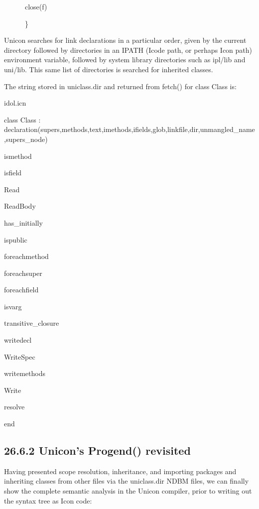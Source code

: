 {\ttfamily\mdseries
\ \ \ \ \ \ close(f)}

{\ttfamily\mdseries
\ \ \ \ \ \ \}}


Unicon searches for {\textquotedbl}link{\textquotedbl} declarations in
a particular order, given by the current directory followed by
directories in an IPATH (Icode path, or perhaps Icon path) environment
variable, followed by system library directories such as ipl/lib and
uni/lib. This same list of directories is searched for inherited
classes.


The string stored in uniclass.dir and returned from fetch() for class Class is: 

{\ttfamily\mdseries
idol.icn}

{\ttfamily\mdseries
class Class : declaration(supers,methods,text,imethods,ifields,glob,linkfile,dir,unmangled\_name,supers\_node)}

{\ttfamily\mdseries
ismethod}

{\ttfamily\mdseries
isfield}

{\ttfamily\mdseries
Read}

{\ttfamily\mdseries
ReadBody}

{\ttfamily\mdseries
has\_initially}

{\ttfamily\mdseries
ispublic}

{\ttfamily\mdseries
foreachmethod}

{\ttfamily\mdseries
foreachsuper}

{\ttfamily\mdseries
foreachfield}

{\ttfamily\mdseries
isvarg}

{\ttfamily\mdseries
transitive\_closure}

{\ttfamily\mdseries
writedecl}

{\ttfamily\mdseries
WriteSpec}

{\ttfamily\mdseries
writemethods}

{\ttfamily\mdseries
Write}

{\ttfamily\mdseries
resolve}

{\ttfamily\mdseries
end}

\subsection[26.6.2 Unicon's Progend() revisited]{26.6.2 Unicon's Progend() revisited}

Having presented scope resolution, inheritance, and importing packages
and inheriting classes from other files via the uniclass.dir NDBM
files, we can finally show the complete semantic analysis in the
Unicon compiler, prior to writing out the syntax tree as Icon code:

